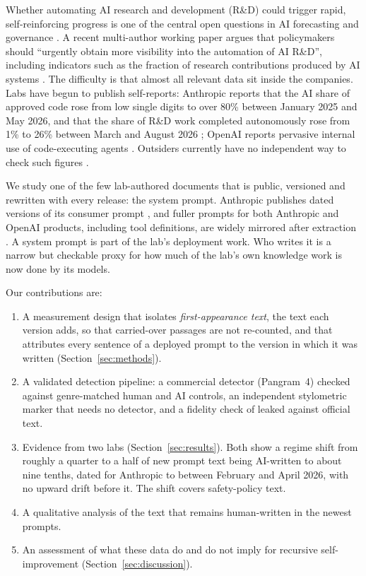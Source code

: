 \documentclass[11pt]{article}
\begin{document}
Whether automating AI research and development (R\&D) could trigger rapid, self-reinforcing progress is one of the central open questions in AI forecasting and governance \citep{good1966speculations,bostrom2014superintelligence,eth2025sie,chan2026explosion}. A recent multi-author working paper argues that policymakers should ``urgently obtain more visibility into the automation of AI R\&D'', including indicators such as the fraction of research contributions produced by AI systems \citep{chan2026explosion}. The difficulty is that almost all relevant data sit inside the companies. Labs have begun to publish self-reports: Anthropic reports that the AI share of approved code rose from low single digits to over 80\% between January 2025 and May 2026, and that the share of R\&D work completed autonomously rose from 1\% to 26\% between March and August 2026 \citep{favaro2026builds,favaro2026measurements}; OpenAI reports pervasive internal use of code-executing agents \citep{openai2026acceleration}. Outsiders currently have no independent way to check such figures \citep{kwon2026internal,stix2025closed,brundage2026auditing}.

We study one of the few lab-authored documents that is public, versioned and rewritten with every release: the system prompt. Anthropic publishes dated versions of its consumer prompt \citep{anthropic2026sysprompts}, and fuller prompts for both Anthropic and OpenAI products, including tool definitions, are widely mirrored after extraction \citep{cl4r1t4s}. A system prompt is part of the lab's deployment work. Who writes it is a narrow but checkable proxy for how much of the lab's own knowledge work is now done by its models.

Our contributions are:
\begin{enumerate}
\item A measurement design that isolates \emph{first-appearance text}, the text each version adds, so that carried-over passages are not re-counted, and that attributes every sentence of a deployed prompt to the version in which it was written (Section~\ref{sec:methods}).
\item A validated detection pipeline: a commercial detector (Pangram~4) checked against genre-matched human and AI controls, an independent stylometric marker that needs no detector, and a fidelity check of leaked against official text.
\item Evidence from two labs (Section~\ref{sec:results}). Both show a regime shift from roughly a quarter to a half of new prompt text being AI-written to about nine tenths, dated for Anthropic to between February and April 2026, with no upward drift before it. The shift covers safety-policy text.
\item A qualitative analysis of the text that remains human-written in the newest prompts.
\item An assessment of what these data do and do not imply for recursive self-improvement (Section~\ref{sec:discussion}).
\end{enumerate}
\end{document}
